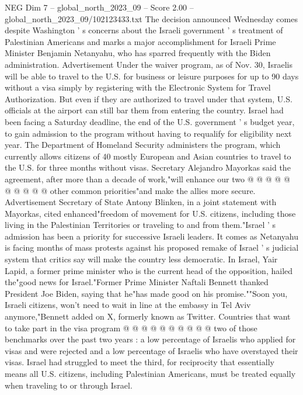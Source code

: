 \begin{textsample}{NEG Dim 7 – global\_north\_2023\_09 – Score 2.00 – global\_north\_2023\_09/102123433.txt}  \label{ex:f7_neg_088}
The decision announced Wednesday comes despite Washington ' s concerns about the Israeli government ' s treatment of Palestinian Americans and marks a major accomplishment for Israeli Prime Minister Benjamin Netanyahu, who has sparred frequently with the Biden administration.
Advertisement Under the waiver program, as of Nov. 30, Israelis will be able to travel to the U.S. for business or leisure purposes for up to 90 days without a visa simply by registering with the Electronic System for Travel Authorization.
But even if they are authorized to travel under that system, U.S. officials at the airport can still bar them from entering the country.
Israel had been facing a Saturday deadline, the end of the U.S. government ' s budget year, to gain admission to the program without having to requalify for eligibility next year.
The Department of Homeland Security administers the program, which currently allows citizens of 40 mostly European and Asian countries to travel to the U.S. for three months without visas.
Secretary Alejandro Mayorkas said the agreement, after more than a decade of work,"will enhance our two @ @ @ @ @ @ @ @ @ @ other common priorities"and make the allies more secure.
Advertisement Secretary of State Antony Blinken, in a joint statement with Mayorkas, cited enhanced"freedom of movement for U.S. citizens, including those living in the Palestinian Territories or traveling to and from them."Israel ' s admission has been a priority for successive Israeli leaders.
It comes as Netanyahu is facing months of mass protests against his proposed remake of Israel ' s judicial system that critics say will make the country less democratic.
In Israel, Yair Lapid, a former prime minister who is the current head of the opposition, hailed the"good news for Israel."Former Prime Minister Naftali Bennett thanked President Joe Biden, saying that he"has made good on his promise.""Soon you, Israeli citizens, won't need to wait in line at the embassy in Tel Aviv anymore,"Bennett added on X, formerly known as Twitter.
Countries that want to take part in the visa program @ @ @ @ @ @ @ @ @ @ two of those benchmarks over the past two years : a low percentage of Israelis who applied for visas and were rejected and a low percentage of Israelis who have overstayed their visas.
Israel had struggled to meet the third, for reciprocity that essentially means all U.S. citizens, including Palestinian Americans, must be treated equally when traveling to or through Israel.

\end{textsample}

